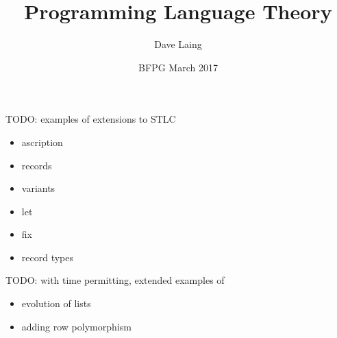 \documentclass[center]{beamer}
\title{Programming Language Theory}
\author{Dave Laing}
\date{BFPG March 2017}
\begin{document}
\begin{frame}
\maketitle
\end{frame}

























% 

\begin{frame}[c]
  TODO: examples of extensions to STLC
  \begin{itemize}
  \item ascription
  \item records
  \item variants
  \item let
  \item fix
  \item record types
  \end{itemize}
\end{frame}

%
%

\begin{frame}[c]
  TODO: with time permitting, extended examples of
  \begin{itemize}
    \item evolution of lists
    \item adding row polymorphism
  \end{itemize}
\end{frame}

%
%


\end{document}
